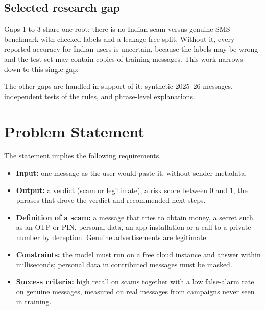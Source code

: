 \documentclass[12pt,a4paper]{report}
\begin{document}
\section{Selected research gap}
Gaps 1 to 3 share one root: there is no Indian scam-versus-genuine SMS benchmark with checked labels and a leakage-free split. Without it, every reported accuracy for Indian users is uncertain, because the labels may be wrong and the test set may contain copies of training messages. This work narrows down to this single gap:

\begin{center}
\end{center}

The other gaps are handled in support of it: synthetic 2025--26 messages, independent tests of the rules, and phrase-level explanations.

\chapter{Problem Statement}
\begin{center}
\end{center}

\vspace{0.3cm}
The statement implies the following requirements.
\begin{itemize}
\item \textbf{Input:} one message as the user would paste it, without sender metadata.
\item \textbf{Output:} a verdict (scam or legitimate), a risk score between 0 and 1, the phrases that drove the verdict and recommended next steps.
\item \textbf{Definition of a scam:} a message that tries to obtain money, a secret such as an OTP or PIN, personal data, an app installation or a call to a private number by deception. Genuine advertisements are legitimate.
\item \textbf{Constraints:} the model must run on a free cloud instance and answer within milliseconds; personal data in contributed messages must be masked.
\item \textbf{Success criteria:} high recall on scams together with a low false-alarm rate on genuine messages, measured on real messages from campaigns never seen in training.
\end{itemize}
\end{document}
